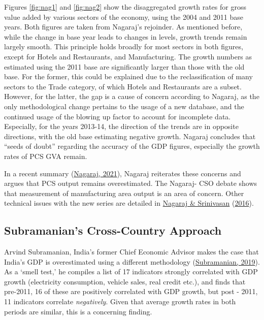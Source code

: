 \documentclass[12pt,nobind, a4paper]{reedthesis}
\begin{document}
 Figures \ref{fig:nag1} and \ref{fig:nag2} show the disaggregated growth rates for gross value added by various sectors of the economy, using the 2004 and 2011 base years. Both figures are taken from Nagaraj's rejoinder. As mentioned before, while the change in base year leads to changes in levels, growth trends remain largely smooth. This principle holds broadly for most sectors in both figures, except for Hotels and Restaurants, and Manufacturing. The growth numbers as estimated using the 2011 base are significantly larger than those with the old base. For the former, this could be explained due to the reclassification of many sectors to the Trade category, of which Hotels and Restaurants are a subset. However, for the latter, the gap is a cause of concern according to Nagaraj, as the only methodological change pertains to the usage of a new database, and the continued usage of the blowing up factor to account for incomplete data. Especially, for the years 2013-14, the direction of the trends are in opposite directions, with the old base estimating negative growth. Nagaraj concludes that ``seeds of doubt'' regarding the accuracy of the GDP figures, especially the growth rates of PCS GVA remain.
 \linebreak

 In a recent summary (\protect\hyperlink{ref-nagaraj_revisiting_2021}{Nagaraj, 2021}), Nagaraj reiterates these concerns and argues that PCS output remains overestimated. The Nagaraj- CSO debate shows that measurement of manufacturing area output is an area of concern. Other technical issues with the new series are detailed in \protect\hyperlink{ref-nagaraj_measuring_2016}{Nagaraj \& Srinivasan} (\protect\hyperlink{ref-nagaraj_measuring_2016}{2016}).

 \hypertarget{subramanians-cross-country-approach}{%
 \subsection{Subramanian's Cross-Country Approach}\label{subramanians-cross-country-approach}}

 Arvind Subramanian, India's former Chief Economic Advisor makes the case that India's GDP is overestimated using a different methodology (\protect\hyperlink{ref-subramanian_indias_2019}{Subramanian, 2019}). As a `smell test,' he compiles a list of 17 indicators strongly correlated with GDP growth (electricity consumption, vehicle sales, real credit etc.), and finds that pre-2011, 16 of these are positively correlated with GDP growth, but post - 2011, 11 indicators correlate \emph{negatively}. Given that average growth rates in both periods are similar, this is a concerning finding.
 \linebreak
\end{document}
